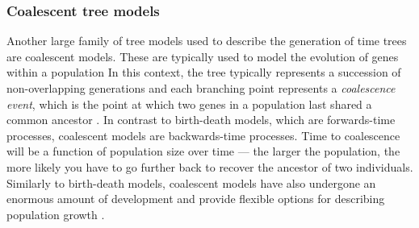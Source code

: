 \subsubsection{Coalescent tree models}
Another large family of tree models used to describe the generation of time trees are coalescent models. 
These are typically used to model the evolution of genes within a population
In this context, the tree typically represents a succession of non-overlapping generations and each branching point represents a \textit{coalescence event}, which is the point at which two genes in a population last shared a common ancestor \citep{Kingman1982}.
In contrast to birth-death models, which are forwards-time processes, coalescent models are backwards-time processes.
Time to coalescence will be a function of population size over time --- the larger the population, the more likely you have to go further back to recover the ancestor of two individuals. %
Similarly to birth-death models, coalescent models have also undergone an enormous amount of development and provide flexible options for describing population growth \citep{Beerli2001, Drummond2005, Mashayekhi2019}. %


